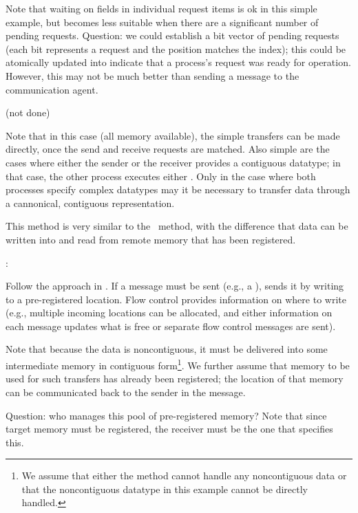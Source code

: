 \begin{mmadi}
\begin{shmem}
Note that waiting on fields in individual request items is ok in this simple
example, but becomes less suitable when there are a significant number of
pending requests.  Question: we could establish a bit vector of pending
requests (each bit represents a request and the position matches the index);
this could be atomically updated into indicate that a process's 
request was ready for operation.  However, this may not be much better than
sending a message to the communication agent.

\end{shmem}

\begin{shmemall}
(not done)

Note that in this case (all memory available), the simple transfers can be
made directly, once the send and receive requests are matched.  Also simple
are the cases where either the sender or the receiver provides a contiguous
datatype; in that case, the other process executes either
 .  Only in the case where both
processes specify complex datatypes may it be necessary to transfer data
through a cannonical, contiguous representation.
\end{shmemall}

\begin{via}
This method is very similar to the \tcpname\ method, with the difference that
data can be written into and read from remote memory that has been registered.

:

Follow the approach in \tcpname.  
If a message must be sent (e.g., a
),  sends it by writing to
a pre-registered location.  Flow control provides information on where to
write (e.g., multiple incoming locations can be allocated, and either
information on each message updates what is free or separate flow control
messages are sent).   

Note that because the data is noncontiguous, it must be delivered into some
intermediate memory in contiguous form\footnote{We assume that either the
  method cannot handle any noncontiguous data or that the noncontiguous
  datatype in this example cannot be directly handled.}.  We further assume
that memory to be used for such transfers has already been registered; the
location of that memory can be communicated back to the sender in the
 message.  

Question: who manages this pool of pre-registered memory?  Note that since
target memory must be registered, the receiver must be the one that specifies
this.  


\end{via}
\end{mmadi}
